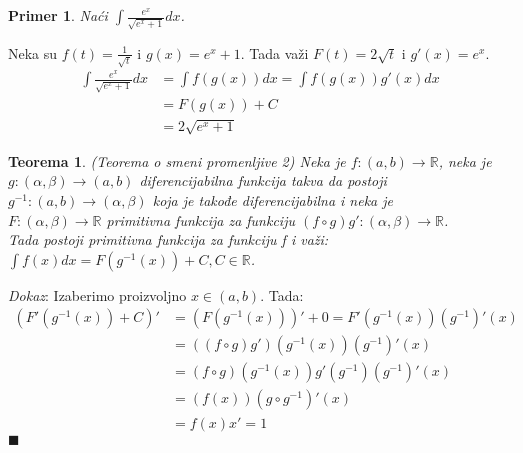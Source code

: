 \documentclass{article}
\newtheorem{teorema}{Teorema}[section]
\newtheorem{prim}{Primer}[section]
\begin{document}
\begin{primbox}
    \begin{prim}
        Naći $\int \frac{e^x}{\sqrt{e^x + 1}}dx$.
    \end{prim}
    Neka su $f(t) = \frac{1}{\sqrt{t}}$ i $g(x) = e^x+1$. Tada važi $F(t) = 2  \sqrt{t}$ i $g'(x) = e^x$.
    \begin{align*}
        \int\frac{e^x}{\sqrt{e^x + 1}}dx & = \int f(g(x))dx = \int f(g(x))g'(x)dx
        \\ & = F(g(x)) + C
        \\ & = 2 \sqrt{ e^x+1}
    \end{align*}
\end{primbox}
\begin{teoremabox}
    \begin{teorema} \label{teorema_1.3}
        (Teorema o smeni promenljive 2)
        Neka je $f:(a, b) \longrightarrow \mathbb{R}$, neka je
        $g:(\alpha, \beta) \longrightarrow (a, b)$
        diferencijabilna funkcija takva da postoji
        $g^{-1}:(a,b) \longrightarrow (\alpha, \beta)$
        koja je takođe diferencijabilna i neka je \\
        $F:(\alpha, \beta) \longrightarrow \mathbb{R}$
        primitivna funkcija za funkciju
        $(f\circ g) g' : (\alpha, \beta) \longrightarrow \mathbb{R}$.\\
        Tada postoji primitivna funkcija za funkciju f i važi:
        $\int f(x) dx = F(g^{-1}(x)) + C, C \in \mathbb{R}$.
    \end{teorema}
\end{teoremabox}
\textit{Dokaz}: Izaberimo proizvoljno $x \in (a, b)$. Tada:
\begin{align*}
    (F'(g^{-1}(x)) + C)' & = (F(g^{-1}(x)))' + 0 = F'(g^{-1}(x)) (g^{-1})'(x) \\
                         & = ((f\circ g) g')(g^{-1}(x)) (g^{-1})'(x)          \\
                         & = (f\circ g)(g^{-1}(x)) g'(g^{-1}) (g^{-1})'(x)    \\
                         & = (f(x)) (g \circ g^{-1})'(x)                      \\
                         & = f(x) x' = 1
\end{align*}
\null\hfill $\blacksquare$ \par
\end{document}
